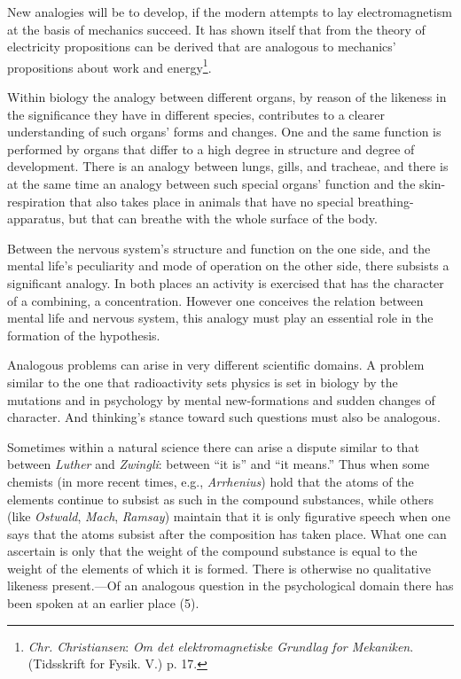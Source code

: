 \documentclass[12pt,a4paper]{book}
\newcommand{\opage}[1]{\marginnote{\footnotesize\textit{[#1]}}}
\begin{document}
New analogies will be to develop, if the modern attempts to lay
electromagnetism at the basis of mechanics succeed. It has shown itself that
from the theory of electricity propositions can be derived that are analogous
to mechanics' propositions about work and energy\footnote{\emph{Chr.
Christiansen}: \emph{Om det elektromagnetiske Grundlag for Mekaniken}.
(Tidsskrift for Fysik. V.) p. 17.}.

\opage{185}Within biology the analogy between different organs, by reason of the
likeness in the significance they have in different species, contributes to a
clearer understanding of such organs' forms and changes. One and the same
function is performed by organs that differ to a high degree in structure and
degree of development. There is an analogy between lungs, gills, and tracheae,
and there is at the same time an analogy between such special organs'
function and the skin-respiration that also takes place in animals that have
no special breathing-apparatus, but that can breathe with the whole surface
of the body.

Between the nervous system's structure and function on the one side, and the
mental life's peculiarity and mode of operation on the other side, there
subsists a significant analogy. In both places an activity is exercised that
has the character of a combining, a concentration. However one conceives the
relation between mental life and nervous system, this analogy must play an
essential role in the formation of the hypothesis.

Analogous problems can arise in very different scientific domains. A problem
similar to the one that radioactivity sets physics is set in biology by the
mutations and in psychology by mental new-formations and sudden changes of
character. And thinking's stance toward such questions must also be
analogous.

Sometimes within a natural science there can arise a dispute similar to that
between \emph{Luther} and \emph{Zwingli}: between ``it is'' and ``it means.''
Thus when some chemists (in more recent times, e.g., \emph{Arrhenius}) hold
that the atoms of the elements continue to subsist as such in the compound
substances, while others (like \emph{Ostwald}, \emph{Mach}, \emph{Ramsay})
maintain that it is only figurative speech when one says that the atoms
subsist after the composition has taken place. What one can ascertain is only
that the weight of the compound substance is equal to the weight of the
elements of which it is formed. There is otherwise no qualitative likeness
present.---Of an analogous question in the psychological domain there has been
spoken at an earlier place (5).
\end{document}
